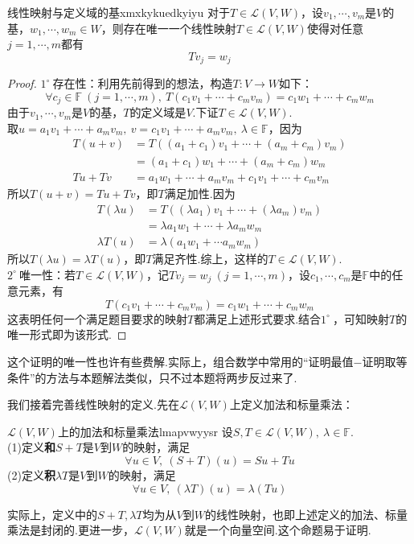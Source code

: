 \documentclass[lang=cn, zihao=5]{elegantbook}
\newcommand{\F}{\mathbb{F}}
\newcommand{\lmap}{\mathcal{L}}
\newcommand{\buzhou}[1]{$#1^{\circ} \ $}
\begin{document}
\begin{proposition}{线性映射与定义域的基}{xmxkykuedkyiyu}
	对于$T \in \lmap (V,W)$，设$v_1, \cdots ,v_m$是$V$的基，$w_1, \cdots ,w_m \in W$，则存在唯一一个线性映射$T \in \lmap (V,W)$使得对任意$j=1, \cdots ,m$都有$$Tv_j = w_j$$
\end{proposition}
\begin{proof}
	\buzhou{1}存在性：利用先前得到的想法，构造$T:V \to W$如下：$$\forall c_j \in \F~(j=1, \cdots,m),~T(c_1v_1 + \cdots + c_mv_m) = c_1w_1 + \cdots + c_mw_m$$
	由于$v_1, \cdots ,v_m$是$V$的基，$T$的定义域是$V$.下证$T \in \lmap (V,W)$. \\
	取$u=a_1v_1 + \cdots + a_mv_m,~v=c_1v_1 + \cdots + a_mv_m,~ \lambda \in \F$，因为
	\begin{align*}
		T(u+v) &= T((a_1+c_1)v_1 + \cdots + (a_m+c_m)v_m) \\
		&= (a_1+c_1)w_1 + \cdots + (a_m+c_m)w_m \\
		Tu+Tv &= a_1w_1 + \cdots + a_mv_m + c_1v_1 + \cdots + c_mv_m
	\end{align*}
	所以$T(u+v)=Tu+Tv$，即$T$满足加性.因为
	\begin{align*}
		T(\lambda u) &= T((\lambda a_1)v_1 + \cdots + (\lambda a_m)v_m) \\
		&= \lambda a_1 w_1 + \cdots + \lambda a_m w_m \\
		\lambda T(u) &= \lambda (a_1w_1 + \cdots a_mw_m)
	\end{align*}
	所以$T(\lambda u)=\lambda T(u)$，即$T$满足齐性.综上，这样的$T \in \lmap (V,W)$. \\
	\buzhou{2}唯一性：若$T \in \lmap (V,W)$，记$T v_j = w_j~(j=1,\cdots ,m)$，设$c_1, \cdots ,c_m$是$\F$中的任意元素，有$$T(c_1v_1 + \cdots + c_mv_m) = c_1w_1 + \cdots + c_mw_m$$
	这表明任何一个满足题目要求的映射$T$都满足上述形式要求.结合\buzhou{1}，可知映射$T$的唯一形式即为该形式.
\end{proof}
\begin{remark}
	这个证明的唯一性也许有些费解.实际上，组合数学中常用的“证明最值$-$证明取等条件”的方法与本题解法类似，只不过本题将两步反过来了.
\end{remark}

我们接着完善线性映射的定义.先在$\lmap (V,W)$上定义加法和标量乘法：

\begin{definition}{$\lmap (V,W)$上的加法和标量乘法}{lmapvwyysr}
	设$S,T \in \lmap (V,W),~\lambda \in \F$. \\
	(1)定义\textbf{和}$S+T$是$V$到$W$的映射，满足$$\forall u \in V,~(S+T)(u)=Su+Tu$$
	(2)定义\textbf{积}$\lambda T$是$V$到$W$的映射，满足$$\forall u \in V,~(\lambda T)(u) = \lambda (Tu)$$
\end{definition}
\begin{remark}
	实际上，定义中的$S+T,\lambda T$均为从$V$到$W$的线性映射，也即上述定义的加法、标量乘法是封闭的.更进一步，$\lmap (V,W)$就是一个向量空间.这个命题易于证明.
\end{remark}
\end{document}
